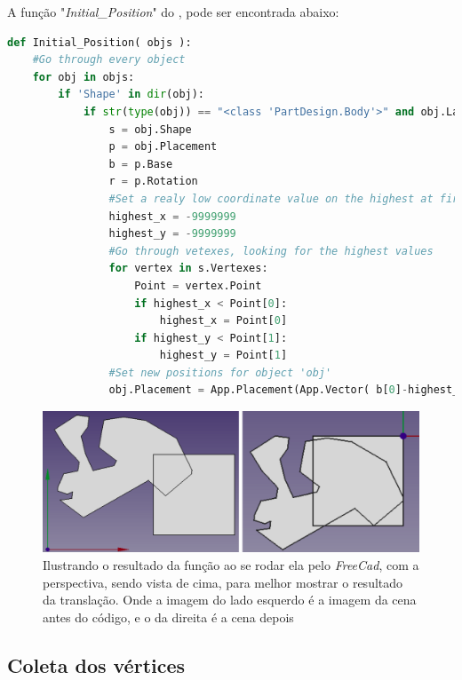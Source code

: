 A função "\textit{Initial\_Position}" do \cite{code:FreeCad_Miner}, pode ser encontrada abaixo:

\begin{lstlisting}[language=Python, breaklines, caption = \textit{Initial\_Position}, captionpos=b]
def Initial_Position( objs ):
    #Go through every object
    for obj in objs:
        if 'Shape' in dir(obj):
            if str(type(obj)) == "<class 'PartDesign.Body'>" and obj.Label != "Board Body":
                s = obj.Shape
                p = obj.Placement
                b = p.Base
                r = p.Rotation
                #Set a realy low coordinate value on the highest at first, so it will switch for sure
                highest_x = -9999999
                highest_y = -9999999
                #Go through vetexes, looking for the highest values    
                for vertex in s.Vertexes:
                    Point = vertex.Point
                    if highest_x < Point[0]:
                        highest_x = Point[0]
                    if highest_y < Point[1]:
                        highest_y = Point[1]
                #Set new positions for object 'obj'
                obj.Placement = App.Placement(App.Vector( b[0]-highest_x, b[1]-highest_y, b[2], r) )
\end{lstlisting}

\begin{figure}[H]
    \centering
    \includegraphics[scale=0.4]{Capitulos/Cap03_figs/Initial_Position.png}
    \caption{Ilustrando o resultado da função ao se rodar ela pelo \textit{FreeCad}, com a perspectiva, sendo vista de cima, para melhor mostrar o resultado da translação. Onde a imagem do lado esquerdo é a imagem da cena antes do código, e o da direita é a cena depois}
    \label{fig:Cap03_FreeCad_Initial_Position}
\end{figure}

\subsection{Coleta dos vértices}

